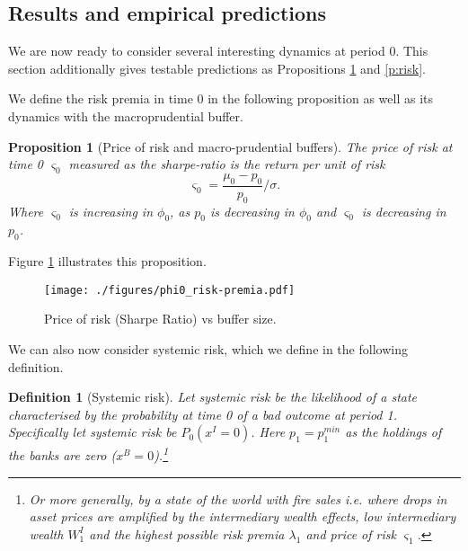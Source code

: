 \documentclass[11pt]{article}
\newtheorem{proposition}{Proposition}
\newtheorem{definition}{Definition}%
\begin{document}
\subsection*{Results and empirical predictions}
We are now ready to consider several interesting dynamics at period 0. This section additionally gives testable predictions as Propositions \ref{p:price} and \ref{p:risk}.

We define the risk premia in time 0 in the following proposition as well as its dynamics with the macroprudential buffer.

\begin{proposition}[Price of risk and macro-prudential buffers]
\label{p:price}
The price of risk at time 0 $\varsigma_0$ measured as the sharpe-ratio is the return per unit of risk
\begin{equation}
\varsigma_0 = \frac{\mu_0 - p_0}{p_0}/\sigma.
\end{equation}
Where $\varsigma_0$ is increasing in $\phi_0$, as $p_0$ is decreasing in $\phi_0$ and $\varsigma_0$ is decreasing in $p_0$.
\end{proposition}

\noindent Figure \ref{f_probSRvsBuffer} illustrates this proposition.

\begin{figure}[h]
\centering
\texttt{[image: ./figures/phi0\_risk-premia.pdf]}
\caption{%
Price of risk (Sharpe Ratio) vs buffer size.\\%
}
\label{f_probSRvsBuffer}

\end{figure}


We can also now consider systemic risk, which we define in the following definition.

\begin{definition}[Systemic risk]
Let systemic risk be the likelihood of a state characterised by the probability at time 0 of a bad outcome at period 1. Specifically let systemic risk be $P_0 (x^I=0)$. Here $p_1 = p_1^{min}$ as the holdings of the banks are zero ($x^B = 0$).\footnote{Or more generally, by a state of the world with fire sales i.e. where drops in asset prices are amplified by the intermediary wealth effects, low intermediary wealth $W^I_1$ and the highest possible risk premia $\lambda_1$ and price of risk $\varsigma_1$.}
\end{definition}
\end{document}
